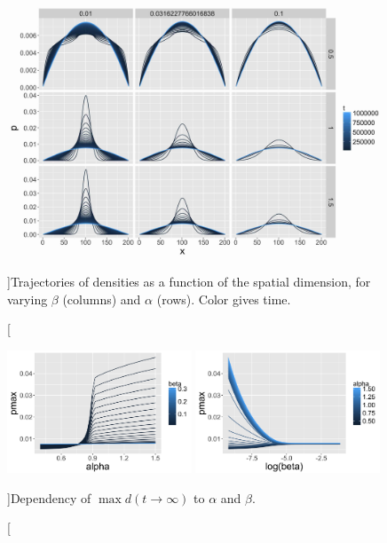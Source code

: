 \begin{figure}[!h]
\centering
\includegraphics[width=\textwidth]{Figures/Density/stationary}
\caption[][]{Trajectories of densities as a function of the spatial dimension, for varying $\beta$ (columns) and $\alpha$ (rows). Color gives time.}{}
\label{fig:stationary}
\end{figure}



\begin{figure}[!h]
\centering
\includegraphics[width=0.49\textwidth]{Figures/Density/pmax_alpha}
\includegraphics[width=0.49\textwidth]{Figures/Density/pmax_logbeta}
\caption[][]{Dependency of $\max d(t\rightarrow \infty )$ to $\alpha$ and $\beta$.}{}
\label{fig:pmax}
\end{figure}







